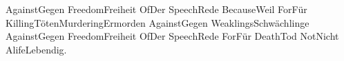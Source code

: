 AgainstGegen FreedomFreiheit OfDer SpeechRede BecauseWeil ForFür KillingTötenMurderingErmorden AgainstGegen WeaklingsSchwächlinge AgainstGegen FreedomFreiheit OfDer SpeechRede ForFür DeathTod NotNicht AlifeLebendig.
